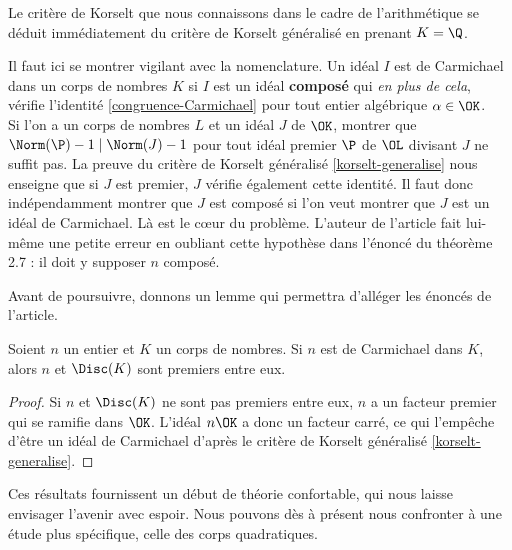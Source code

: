 \begin{remarque}
	Le critère de Korselt que nous connaissons dans le cadre de l'arithmétique se déduit immédiatement du critère de Korselt généralisé en prenant $K=\Q$.
\end{remarque}

\begin{remarque}
	Il faut ici se montrer vigilant avec la nomenclature. Un idéal $I$ est de Carmichael dans un corps de nombres $K$ si $I$ est un idéal \textbf{composé} qui \emph{en plus de cela}, vérifie l'identité \ref{congruence-Carmichael} pour tout entier algébrique $\alpha \in \OK$. \\ 

\noindent Si l'on a un corps de nombres $L$ et un idéal $J$ de $\OK$, montrer que $\Norm(\P) - 1\mid \Norm(J) - 1$ pour tout idéal premier $\P$ de $\OL$ divisant $J$ ne suffit pas. La preuve du critère de Korselt généralisé \ref{korselt-generalise} nous enseigne que si $J$ est premier, $J$ vérifie également cette identité. Il faut donc indépendamment montrer que $J$ est composé si l'on veut montrer que $J$ est un idéal de Carmichael. Là est le cœur du problème. L'auteur de l'article fait lui-même une petite erreur en oubliant cette hypothèse dans l'énoncé du théorème 2.7 : il doit y supposer $n$ composé.
\end{remarque}

Avant de poursuivre, donnons un lemme qui permettra d'alléger les énoncés de l'article.

\begin{lemme}
	Soient $n$ un entier et $K$ un corps de nombres. Si $n$ est de Carmichael dans $K$, alors $n$ et $\Disc(K)$ sont premiers entre eux.
\end{lemme}

\begin{proof}
	Si $n$ et $\Disc(K)$ ne sont pas premiers entre eux, $n$ a un facteur premier qui se ramifie dans $\OK$. L'idéal $n\OK$ a donc un facteur carré, ce qui l'empêche d'être un idéal de Carmichael d'après le critère de Korselt généralisé \ref{korselt-generalise}.
\end{proof}

Ces résultats fournissent un début de théorie confortable, qui nous laisse envisager l'avenir avec espoir. Nous pouvons dès à présent nous confronter à une étude plus spécifique, celle des corps quadratiques.
